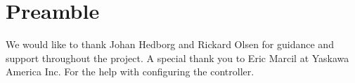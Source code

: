 
\section*{Preamble}

We would like to thank Johan Hedborg and Rickard Olsen for guidance and support throughout the project. A special thank you to Eric Marcil at Yaskawa America Inc. For the help with configuring the controller. 